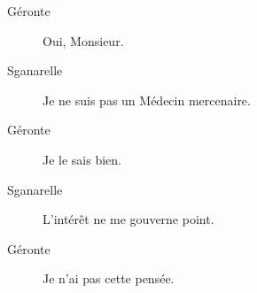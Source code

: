 \documentclass[french,twoside]{book} %
\begin{document}
 \begin{description} \item[Géronte] 

Oui, Monsieur.\end{description}
 \begin{description} \item[Sganarelle] 

Je ne suis pas un Médecin mercenaire.\end{description}
 \begin{description} \item[Géronte] 

Je le sais bien.\end{description}
 \begin{description} \item[Sganarelle] 

L’intérêt ne me gouverne point.\end{description}
 \begin{description} \item[Géronte] 

Je n’ai pas cette pensée.\end{description}
\end{document}
